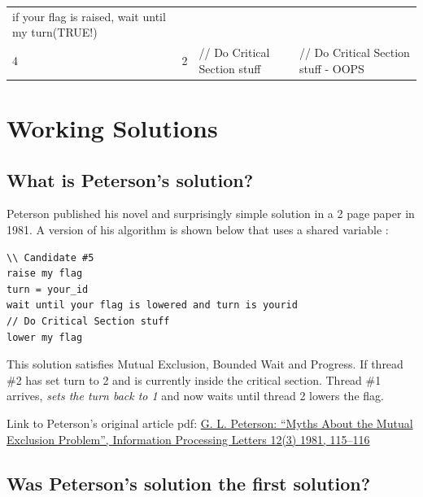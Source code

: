 \begin{longtable}[c]{@{}|l|l|l|l|@{}}
\begin{minipage}[t]{0.14\columnwidth}
if your flag is raised, wait until my turn(TRUE!)
\strut\end{minipage}\hline \tabularnewline
\begin{minipage}[t]{0.07\columnwidth}\raggedright\strut
4
\strut\end{minipage} & \begin{minipage}[t]{0.09\columnwidth}\raggedright\strut
2
\strut\end{minipage} & \begin{minipage}[t]{0.15\columnwidth}\raggedright\strut
// Do Critical Section stuff
\strut\end{minipage} & \begin{minipage}[t]{0.14\columnwidth}\raggedright\strut
// Do Critical Section stuff - OOPS
\strut\end{minipage}\hline \tabularnewline
\bottomrule
\end{longtable}

\section{Working Solutions}\label{working-solutions}

\subsection{What is Peterson's solution?}\label{what-is-petersons-solution}

Peterson published his novel and surprisingly simple solution in a 2 page paper in 1981. A version of his algorithm is shown below that uses a shared variable :

\begin{lstlisting}
\\ Candidate #5
raise my flag
turn = your_id
wait until your flag is lowered and turn is yourid
// Do Critical Section stuff
lower my flag
\end{lstlisting}

This solution satisfies Mutual Exclusion, Bounded Wait and Progress. If thread \#2 has set turn to 2 and is currently inside the critical section. Thread \#1 arrives, \emph{sets the turn back to 1} and now waits until thread 2 lowers the flag.

Link to Peterson's original article pdf: \href{http://dl.acm.org/citation.cfm?id=945527}{G. L. Peterson: ``Myths About the Mutual Exclusion Problem'', Information Processing Letters 12(3) 1981, 115--116}

\subsection{Was Peterson's solution the first solution?}\label{was-petersons-solution-the-first-solution}

